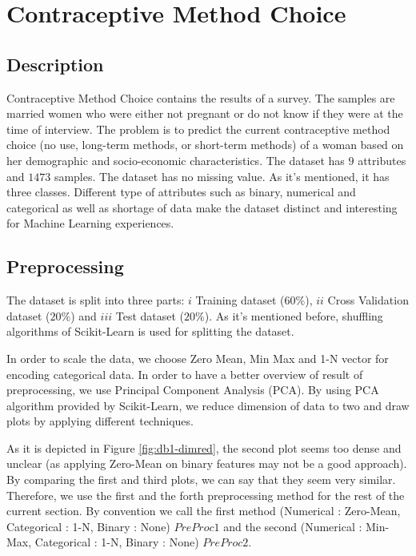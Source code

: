 \section{Contraceptive Method Choice}
\label{db:sec:ds1}
\subsection{Description}
Contraceptive Method Choice contains the results of a survey. The samples are married women who were either not pregnant or do not know if they were at the time of interview. The problem is to predict the current contraceptive method choice (no use, long-term methods, or short-term methods) of a woman based on her demographic and socio-economic characteristics. The dataset has $9$ attributes and $1473$ samples. The dataset has no missing value. As it's mentioned, it has three classes. Different type of attributes such as binary, numerical and categorical as well as shortage of data make the dataset distinct and interesting for Machine Learning experiences.

\subsection{Preprocessing}
The dataset is split into three parts: $i$ Training dataset ($60\%$), $ii$ Cross Validation dataset ($20\%$) and $iii$ Test dataset ($20\%$). As it's mentioned before, shuffling algorithms of Scikit-Learn is used for splitting the dataset.

In order to scale the data, we choose Zero Mean, Min Max and 1-N vector for encoding categorical data. In order to have a better overview of result of preprocessing, we use Principal Component Analysis (PCA). By using PCA algorithm provided by Scikit-Learn, we reduce dimension of data to two and draw plots by applying different techniques. 

As it is depicted in Figure \ref{fig:db1-dimred}, the second plot seems too dense and unclear (as applying Zero-Mean on binary features may not be a good approach). By comparing the first and third plots, we can say that they seem very similar. Therefore, we use the first and the forth preprocessing method for the rest of the current section. By convention we call the first method (Numerical : Zero-Mean, Categorical : 1-N, Binary : None) $PreProc1$ and the second (Numerical : Min-Max, Categorical : 1-N, Binary : None) $PreProc2$. 

